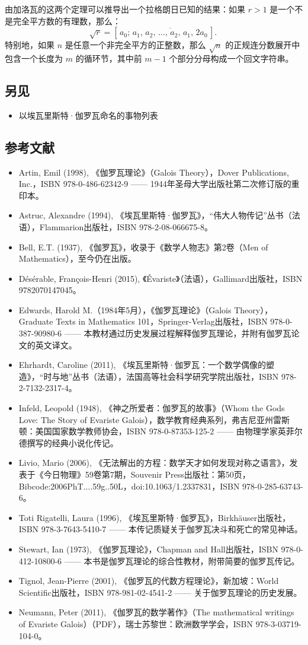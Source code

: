 由加洛瓦的这两个定理可以推导出一个拉格朗日已知的结果：如果 $r > 1$ 是一个不是完全平方数的有理数，那么：
$$
\sqrt{r} = \left[\,a_0;\, \overline{a_1,\,a_2,\,\dots,\,a_2,\,a_1,\,2a_0}\,\right].~
$$
特别地，如果 $n$ 是任意一个非完全平方的正整数，那么 $\sqrt{n}$ 的正规连分数展开中包含一个长度为 $m$ 的循环节，其中前 $m - 1$ 个部分分母构成一个回文字符串。
\subsection{另见}
\begin{itemize}
\item 以埃瓦里斯特·伽罗瓦命名的事物列表
\end{itemize}
\subsection{参考文献}
\begin{itemize}
\item Artin, Emil (1998), 《伽罗瓦理论》（Galois Theory），Dover Publications, Inc.，ISBN 978-0-486-62342-9 —— 1944年圣母大学出版社第二次修订版的重印本。
\item Astruc, Alexandre (1994), 《埃瓦里斯特·伽罗瓦》，“伟大人物传记”丛书（法语），Flammarion出版社，ISBN 978-2-08-066675-8。
\item Bell, E.T. (1937), 《伽罗瓦》，收录于《数学人物志》第2卷（Men of Mathematics），至今仍在出版。
\item Désérable, François-Henri (2015), 《Évariste》（法语），Gallimard出版社，ISBN 9782070147045。
\item Edwards, Harold M.（1984年5月），《伽罗瓦理论》（Galois Theory），Graduate Texts in Mathematics 101，Springer-Verlag出版社，ISBN 978-0-387-90980-6 —— 本教材通过历史发展过程解释伽罗瓦理论，并附有伽罗瓦论文的英文译文。
\item Ehrhardt, Caroline (2011), 《埃瓦里斯特·伽罗瓦：一个数学偶像的塑造》，“时与地”丛书（法语），法国高等社会科学研究学院出版社，ISBN 978-2-7132-2317-4。
\item Infeld, Leopold (1948), 《神之所爱者：伽罗瓦的故事》（Whom the Gods Love: The Story of Evariste Galois），数学教育经典系列，弗吉尼亚州雷斯顿：美国国家数学教师协会，ISBN 978-0-87353-125-2 —— 由物理学家英菲尔德撰写的经典小说化传记。
\item Livio, Mario (2006), 《无法解出的方程：数学天才如何发现对称之语言》，发表于《今日物理》59卷第7期，Souvenir Press出版社：第50页，Bibcode:2006PhT....59g..50L，doi:10.1063/1.2337831，ISBN 978-0-285-63743-6。
\item Toti Rigatelli, Laura (1996), 《埃瓦里斯特·伽罗瓦》，Birkhäuser出版社，ISBN 978-3-7643-5410-7 —— 本传记质疑关于伽罗瓦决斗和死亡的常见神话。
\item Stewart, Ian (1973), 《伽罗瓦理论》，Chapman and Hall出版社，ISBN 978-0-412-10800-6 —— 本书是伽罗瓦理论的综合性教材，附带简要的伽罗瓦传记。
\item Tignol, Jean-Pierre (2001), 《伽罗瓦的代数方程理论》，新加坡：World Scientific出版社，ISBN 978-981-02-4541-2 —— 关于伽罗瓦理论的历史发展。
\item Neumann, Peter (2011), 《伽罗瓦的数学著作》（The mathematical writings of Evariste Galois）（PDF），瑞士苏黎世：欧洲数学学会，ISBN 978-3-03719-104-0。
\end{itemize}
